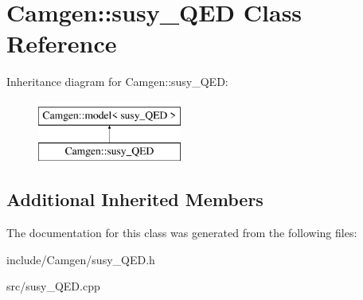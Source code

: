 \hypertarget{a00517}{\section{Camgen\-:\-:susy\-\_\-\-Q\-E\-D Class Reference}
\label{a00517}
}
Inheritance diagram for Camgen\-:\-:susy\-\_\-\-Q\-E\-D\-:\begin{figure}[H]
\begin{center}
\leavevmode
\includegraphics[height=2.000000cm]{a00517}
\end{center}
\end{figure}
\subsection*{Additional Inherited Members}


The documentation for this class was generated from the following files\-:\begin{DoxyCompactItemize}
\item 
include/\-Camgen/susy\-\_\-\-Q\-E\-D.\-h\item 
src/susy\-\_\-\-Q\-E\-D.\-cpp\end{DoxyCompactItemize}
